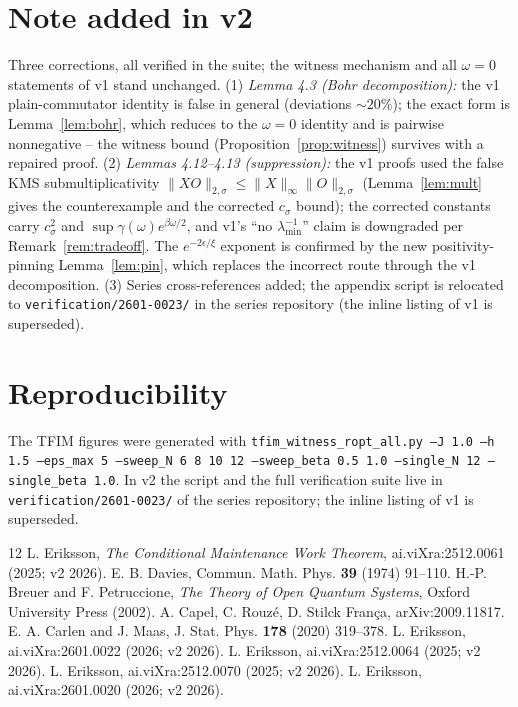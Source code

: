 \documentclass[11pt]{article}
\theoremstyle{remark}
\newcommand{\kms}[1]{\|#1\|_{2,\sigma}}
\begin{document}
\section*{Note added in v2}
Three corrections, all verified in the suite; the witness mechanism and
all $\omega = 0$ statements of v1 stand unchanged.
(1) \emph{Lemma 4.3 (Bohr decomposition):} the v1 plain-commutator
identity is false in general (deviations $\sim 20\%$); the exact form is
Lemma~\ref{lem:bohr}, which reduces to the $\omega = 0$ identity and is
pairwise nonnegative -- the witness bound (Proposition~\ref{prop:witness})
survives with a repaired proof.
(2) \emph{Lemmas 4.12--4.13 (suppression):} the v1 proofs used the false
KMS submultiplicativity $\kms{XO} \le \|X\|_\infty\kms{O}$
(Lemma~\ref{lem:mult} gives the counterexample and the corrected
$c_\sigma$ bound); the corrected constants carry $c_\sigma^2$ and
$\sup\gamma(\omega)e^{\beta\omega/2}$, and v1's ``no
$\lambda_{\min}^{-1}$'' claim is downgraded per
Remark~\ref{rem:tradeoff}. The $e^{-2\epsilon/\xi}$ exponent is confirmed
by the new positivity-pinning Lemma~\ref{lem:pin}, which replaces the
incorrect route through the v1 decomposition.
(3) Series cross-references added; the appendix script is relocated to
\texttt{verification/2601-0023/} in the series repository (the inline
listing of v1 is superseded).

\appendix
\section{Reproducibility}
The TFIM figures were generated with
\texttt{tfim\_witness\_ropt\_all.py --J 1.0 --h 1.5 --eps\_max 5
--sweep\_N 6 8 10 12 --sweep\_beta 0.5 1.0 --single\_N 12
--single\_beta 1.0}. In v2 the script and the full verification suite
live in \texttt{verification/2601-0023/} of the series repository; the
inline listing of v1 is superseded.

\begin{thebibliography}{12}
 L. Eriksson, \emph{The Conditional Maintenance Work
Theorem}, ai.viXra:2512.0061 (2025; v2 2026).
 E. B. Davies, Commun. Math. Phys. \textbf{39} (1974)
91--110.
 H.-P. Breuer and F. Petruccione, \emph{The Theory of Open
Quantum Systems}, Oxford University Press (2002).
 A. Capel, C. Rouz\'e, D. Stilck Fran\c{c}a,
arXiv:2009.11817.
 E. A. Carlen and J. Maas, J. Stat. Phys. \textbf{178} (2020)
319--378.
 L. Eriksson, ai.viXra:2601.0022 (2026; v2 2026).
 L. Eriksson, ai.viXra:2512.0064 (2025; v2 2026).
 L. Eriksson, ai.viXra:2512.0070 (2025; v2 2026).
 L. Eriksson, ai.viXra:2601.0020 (2026; v2 2026).
\end{thebibliography}
\end{document}
